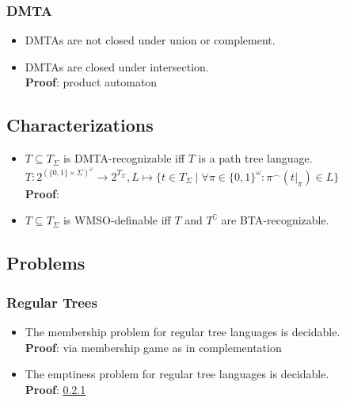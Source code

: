 \documentclass{article}
\begin{document}
\subsubsection{DMTA}
\begin{itemize}
	\item DMTAs are not closed under union or complement. %
	\item DMTAs are closed under intersection. \\
		\textbf{Proof}: product automaton
\end{itemize}

\subsection{Characterizations}
\begin{itemize}
	\item $T \subseteq T_\Sigma$ is DMTA-recognizable iff $T$ is a path tree language. \\
		$T : 2^{(\{0,1\} \times \Sigma)^\omega} \rightarrow 2^{T_\Sigma}, L \mapsto \{ t \in T_\Sigma \mid \forall \pi \in \{0,1\}^\omega: \pi^\smallfrown (t|_\pi) \in L \}$ \\
		\textbf{Proof}: %
	\item $T \subseteq T_\Sigma$ is WMSO-definable iff $T$ and $T^\complement$ are BTA-recognizable. %
\end{itemize}

\subsection{Problems}
\subsubsection{Regular Trees}
\begin{itemize}
	\item The membership problem for regular tree languages is decidable. \\
		\textbf{Proof}: via membership game as in complementation
	\item The emptiness problem for regular tree languages is decidable. \\
		\textbf{Proof}: \ref{} %
\end{itemize}
\end{document}
